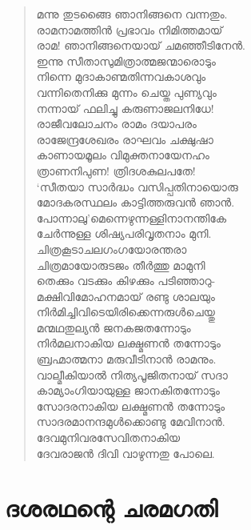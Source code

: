 \begin{verse}
മന്നു തുടങ്ങൈ ഞാനിങ്ങനെ വന്നതും.\\
രാമനാമത്തിന്‍ പ്രഭാവം നിമിത്തമായ്\\
രാമ! ഞാനിങ്ങനെയായ് ചമഞ്ഞീടിനേന്‍.\\
ഇന്നു സീതാസുമിത്രാത്മജന്മാരൊടും\\
നിന്നെ മുദാകാണ്മതിന്നവകാശവും\\
വന്നിതെനിക്കു മുന്നം ചെയ്ത പുണ്യവും\\
നന്നായ് ഫലിച്ചു കരുണാജലനിധേ!\\
രാജീവലോചനം രാമം ദയാപരം\\
രാജേന്ദ്രശേഖരം രാഘവം ചക്ഷുഷാ\\
കാണായമൂലം വിമുക്തനായേനഹം\\
ത്രാണനിപുണ! ത്രിദശകുലപതേ!\\
‘സീതയാ സാര്‍ദ്ധം വസിപ്പതിനായൊരു\\
മോദകരസ്ഥലം കാട്ടിത്തരുവന്‍ ഞാന്‍.\\
പോന്നാലു’മെന്നെഴുന്നള്ളിനാനന്തികേ\\
ചേര്‍ന്നുള്ള ശിഷ്യപരിവൃതനാം മുനി.\\
ചിത്രകൂടാചലഗംഗയോരന്തരാ\\
ചിത്രമായോരുടജം തീര്‍ത്തു മാമുനി\\
തെക്കും വടക്കും കിഴക്കും പടിഞ്ഞാറു-\\
മക്ഷിവിമോഹനമായ് രണ്ടു ശാലയും\\
നിര്‍മിച്ചിവിടെയിരിക്കെന്നരുള്‍ചെയ്തു\\
മന്മഥതുല്യന്‍ ജനകജതന്നോടും\\
നിര്‍മലനാകിയ ലക്ഷ്മണന്‍ തന്നോടും\\
ബ്രഹ്മാത്മനാ മരുവീടിനാന്‍ രാമനും.\\
വാല്മീകിയാല്‍ നിത്യപൂജിതനായ് സദാ\\
കാമ്യാംഗിയായുള്ള ജാനകിതന്നോടും\\
സോദരനാകിയ ലക്ഷ്മണന്‍ തന്നോടും\\
സാദരമാനന്ദമുള്‍ക്കൊണ്ടു മേവിനാന്‍.\\
ദേവമുനിവരസേവിതനാകിയ\\
ദേവരാജന്‍ ദിവി വാഴുന്നതു പോലെ.
\end{verse}


\section{ദശരഥന്റെ ചരമഗതി}

